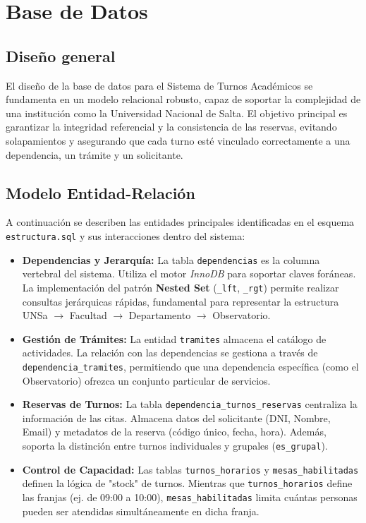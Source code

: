 \chapter{Base de Datos}

\section{Diseño general}
El diseño de la base de datos para el Sistema de Turnos Académicos se fundamenta en un modelo relacional robusto, capaz de soportar la complejidad de una institución como la Universidad Nacional de Salta. El objetivo principal es garantizar la integridad referencial y la consistencia de las reservas, evitando solapamientos y asegurando que cada turno esté vinculado correctamente a una dependencia, un trámite y un solicitante.

\section{Modelo Entidad-Relación}
A continuación se describen las entidades principales identificadas en el esquema \texttt{estructura.sql} y sus interacciones dentro del sistema:

\begin{itemize}
    \item \textbf{Dependencias y Jerarquía:} La tabla \texttt{dependencias} es la columna vertebral del sistema. Utiliza el motor \textit{InnoDB} para soportar claves foráneas. La implementación del patrón \textbf{Nested Set} (\texttt{\_lft}, \texttt{\_rgt}) permite realizar consultas jerárquicas rápidas, fundamental para representar la estructura UNSa $\rightarrow$ Facultad $\rightarrow$ Departamento $\rightarrow$ Observatorio.
    \item \textbf{Gestión de Trámites:} La entidad \texttt{tramites} almacena el catálogo de actividades. La relación con las dependencias se gestiona a través de \texttt{dependencia\_tramites}, permitiendo que una dependencia específica (como el Observatorio) ofrezca un conjunto particular de servicios.
    \item \textbf{Reservas de Turnos:} La tabla \texttt{dependencia\_turnos\_reservas} centraliza la información de las citas. Almacena datos del solicitante (DNI, Nombre, Email) y metadatos de la reserva (código único, fecha, hora). Además, soporta la distinción entre turnos individuales y grupales (\texttt{es\_grupal}).
    \item \textbf{Control de Capacidad:} Las tablas \texttt{turnos\_horarios} y \texttt{mesas\_habilitadas} definen la lógica de "stock" de turnos. Mientras que \texttt{turnos\_horarios} define las franjas (ej. de 09:00 a 10:00), \texttt{mesas\_habilitadas} limita cuántas personas pueden ser atendidas simultáneamente en dicha franja.
\end{itemize}

